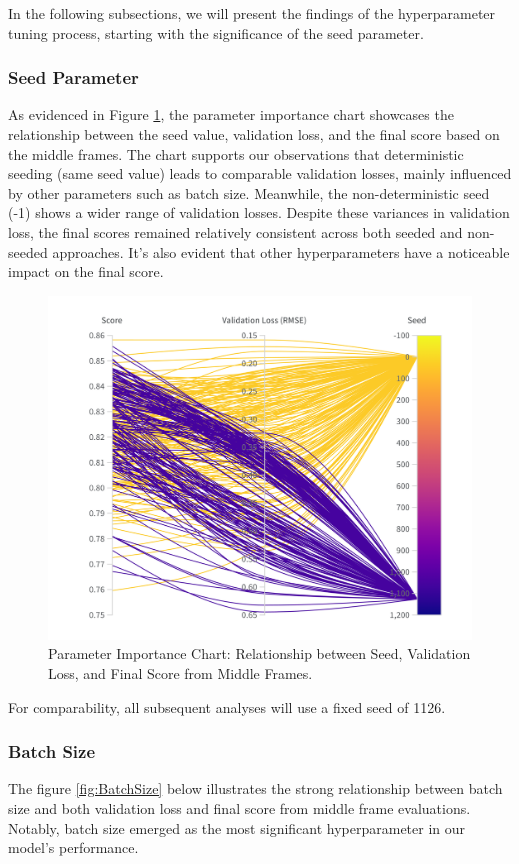 \documentclass[a4paper,12pt,openright]{book}
\begin{document}
In the following subsections, we will present the findings of the hyperparameter tuning process, starting with the significance of the seed parameter.
\subsubsection{Seed Parameter}
As evidenced in Figure \ref{fig:SEED}, the parameter importance chart showcases the relationship between the seed value, validation loss, and the final score based on the middle frames. The chart supports our observations that deterministic seeding (same seed value) leads to comparable validation losses, mainly influenced by other parameters such as batch size. Meanwhile, the non-deterministic seed (-1) shows a wider range of validation losses. Despite these variances in validation loss, the final scores remained relatively consistent across both seeded and non-seeded approaches. It's also evident that other hyperparameters have a noticeable impact on the final score. 

\begin{figure}[H]
\centering
\includegraphics[trim={0cm 2cm 0cm 2cm},clip,width=1.0\textwidth]{images/W&B Chart 03_09_2023, 15_11_19.png}
\caption{Parameter Importance Chart: Relationship between Seed, Validation Loss, and Final Score from Middle Frames.}
\label{fig:SEED}
\end{figure}
For comparability, all subsequent analyses will use a fixed seed of 1126.




\subsubsection{Batch Size}
The figure \ref{fig:BatchSize} below illustrates the strong relationship between batch size and both validation loss and final score from middle frame evaluations. Notably, batch size emerged as the most significant hyperparameter in our model's performance.
\end{document}

